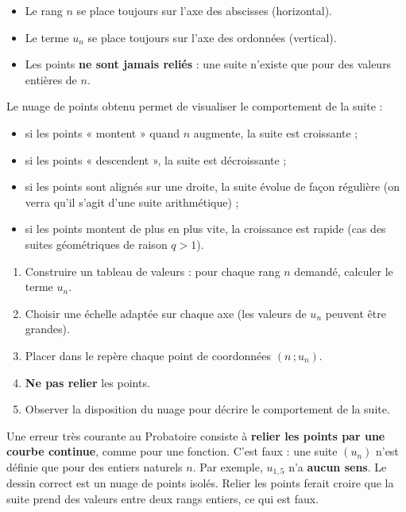 \documentclass[11pt]{article}
\newcommand{\cle}[1]{{\popxbold\color{popdark}#1}}
\begin{document}
\begin{aretenir}[À retenir]
\begin{itemize}
\item Le \cle{rang} $n$ se place toujours sur l'\cle{axe des abscisses} (horizontal).
\item Le \cle{terme} $u_n$ se place toujours sur l'\cle{axe des ordonnées} (vertical).
\item Les points \textbf{ne sont jamais reliés} : une suite n'existe que pour des valeurs entières de $n$.
\end{itemize}
\end{aretenir}

Le nuage de points obtenu permet de visualiser le \cle{comportement} de la suite :
\begin{itemize}
\item si les points « montent » quand $n$ augmente, la suite est \cle{croissante} ;
\item si les points « descendent », la suite est \cle{décroissante} ;
\item si les points sont \cle{alignés} sur une droite, la suite évolue de façon régulière (on verra qu'il s'agit d'une suite arithmétique) ;
\item si les points montent de plus en plus vite, la croissance est rapide (cas des suites géométriques de raison $q > 1$).
\end{itemize}

\begin{methode}
\begin{enumerate}
\item Construire un \cle{tableau de valeurs} : pour chaque rang $n$ demandé, calculer le terme $u_n$.
\item Choisir une \cle{échelle} adaptée sur chaque axe (les valeurs de $u_n$ peuvent être grandes).
\item Placer dans le repère chaque point de coordonnées $(n\,; u_n)$.
\item \textbf{Ne pas relier} les points.
\item Observer la disposition du nuage pour décrire le comportement de la suite.
\end{enumerate}
\end{methode}

\begin{attention}
Une erreur très courante au Probatoire consiste à \textbf{relier les points par une courbe continue}, comme pour une fonction. C'est faux : une suite $(u_n)$ n'est définie que pour des entiers naturels $n$. Par exemple, $u_{1,5}$ n'a \textbf{aucun sens}. Le dessin correct est un \cle{nuage de points isolés}. Relier les points ferait croire que la suite prend des valeurs entre deux rangs entiers, ce qui est faux.
\end{attention}
\end{document}
